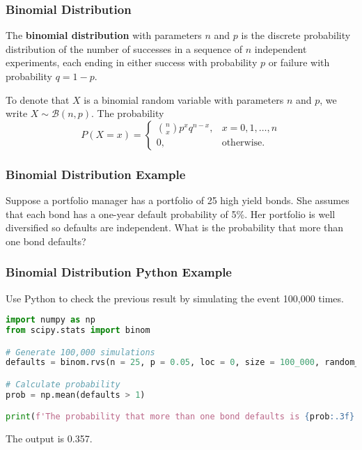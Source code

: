 \documentclass{beamer}
\begin{document}
\begin{frame}
\frametitle{Binomial Distribution}
\small 
\begin{Definition}
The {\bf binomial distribution} with parameters $n$ and $p$ is the discrete probability distribution of the number of successes in a sequence of $n$ independent experiments, each ending in either success with probability $p$ or failure with probability $q = 1- p$.
\end{Definition}
To denote that $X$ is a binomial random variable with parameters $n$ and $p$, we write $X\sim{\mathcal{B}(n, p)}$. The probability 
$$
\displaystyle P(X = x) = \begin{cases}{n\choose x} p^x q^{n - x},	&	x = 0, 1, \ldots, n\\ 0,	&\text{otherwise.}\end{cases}
$$
\end{frame}

\begin{frame}[t]
\frametitle{Binomial Distribution Example}
\small
\begin{Example}
Suppose a portfolio manager has a portfolio of 25 high yield bonds. She assumes that each bond has a one-year default probability of 5\%. Her portfolio is well diversified so defaults are independent. What is the probability that more than one bond defaults?
\end{Example}
\end{frame}

\begin{frame}[fragile]
\frametitle{Binomial Distribution Python Example}
\begin{Example}
Use Python to check the previous result by simulating the event 100,000 times. 
\end{Example}

\begin{lstlisting}[language=Python]
import numpy as np
from scipy.stats import binom

# Generate 100,000 simulations
defaults = binom.rvs(n = 25, p = 0.05, loc = 0, size = 100_000, random_state = 0)

# Calculate probability
prob = np.mean(defaults > 1)

print(f'The probability that more than one bond defaults is {prob:.3f}.')
\end{lstlisting}
The output is 0.357.

\end{frame}
\end{document}
